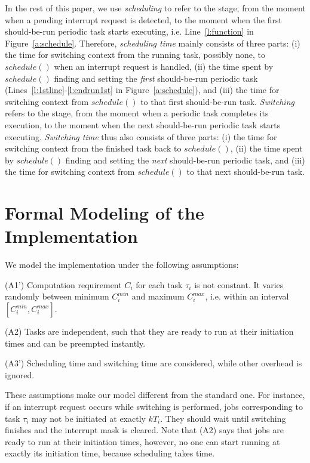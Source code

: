 \documentclass[10pt,journal,compsoc]{IEEEtran}
\begin{document}
In the rest of this paper, we use \emph{scheduling} to refer to the
stage, from the moment when a pending interrupt request is detected,
to the moment when the first should-be-run periodic task starts
executing, i.e. Line~\ref{l:function} in
Figure~\ref{a:schedule}. Therefore, \emph{scheduling time} mainly
consists of three parts: (i) the time for switching context from the
running task, possibly none, to $schedule()$ when an interrupt request
is handled, (ii) the time spent by $schedule()$ finding and setting
the \emph{first} should-be-run periodic task
(Lines~\ref{l:1stline}-\ref{l:endrun1st} in
Figure~\ref{a:schedule}), and (iii) the time for switching context
from $schedule()$ to that first should-be-run task. \emph{Switching}
refers to the stage, from the moment when a periodic task completes
its execution, to the moment when the next should-be-run periodic task
starts executing. \emph{Switching time} thus also consists of three
parts: (i) the time for switching context from the finished task back
to $schedule()$, (ii) the time spent by $schedule()$ finding and
setting the \emph{next} should-be-run periodic task, and (iii) the
time for switching context from $schedule()$ to that next
should-be-run task.


\section{Formal Modeling of the Implementation}
\label{s:formalism}
We model the implementation under the following assumptions:

(A1') Computation requirement $C_i$ for each task $\tau_i$ is not
constant. It varies randomly between minimum $C^{min}_i$ and maximum
$C^{max}_i$, i.e. within an interval $[C^{min}_i, C^{max}_i]$.

(A2) Tasks are independent, such that they are ready to run at their
initiation times and can be preempted instantly.

(A3') Scheduling time and switching time are considered, while other
overhead is ignored.

These assumptions make our model different from the standard one. For
instance, if an interrupt request occurs while switching is performed,
jobs corresponding to task $\tau_i$ may not be initiated at exactly
$kT_i$. They should wait until switching finishes and the interrupt
mask is cleared. Note that (A2) says that jobs are ready to run at
their initiation times, however, no one can start running at exactly
its initiation time, because scheduling takes time.
\end{document}

